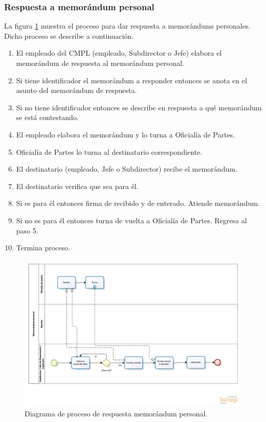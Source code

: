 	\subsubsection{Respuesta a memorándum personal}
	La figura \ref{fig:MemoRePersonal} muestra el proceso para dar respuesta a memorándums personales. Dicho proceso se describe a continuación.
	
	\begin{enumerate}
		\item El empleado del CMPL (empleado, Subdirector o Jefe) elabora el memorándum de respuesta al memorándum personal.
		\item Si tiene identificador el memorándum a responder entonces se anota en el asunto del memorándum de respuesta.
		\item Si no tiene identificador entonces se describe en respuesta a qué memorándum se está contestando.
		\item El empleado elabora el memorándum y lo turna a Oficialía de Partes.
		\item Oficialía de Partes lo turna al destinatario correspondiente.
		\item El destinatario (empleado, Jefe o Subdirector) recibe el memorándum.
		\item El destinatario verifica que sea para él.
		\item Si es para él entonces firma de recibido y de enterado. Atiende memorándum.
		\item Si no es para él entonces turna de vuelta a Oficialía de Partes. Regresa al paso 5.
		\item Termina proceso.
	\end{enumerate}
	
	\begin{figure}[htbp!]
		\centering
			\includegraphics[width=1.2\textwidth]{images/antecedentes/rememopersonal}
		\caption{Diagrama de proceso de respuesta memorándum personal.}
		\label{fig:MemoRePersonal}
	\end{figure}
	
